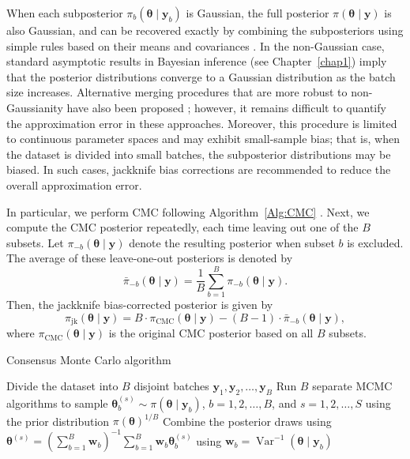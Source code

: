 When each subposterior \( \pi_b(\boldsymbol{\theta} \mid \mathbf{y}_b) \) is Gaussian, the full posterior \( \pi(\boldsymbol{\theta} \mid \mathbf{y}) \) is also Gaussian, and can be recovered exactly by combining the subposteriors using simple rules based on their means and covariances \cite{scott2016bayes, scott2022bayes}. In the non-Gaussian case, standard asymptotic results in Bayesian inference (see Chapter~\ref{chap1}) imply that the posterior distributions converge to a Gaussian distribution as the batch size increases. Alternative merging procedures that are more robust to non-Gaussianity have also been proposed \cite{neiswanger2013asymptotically, minsker2017robust}; however, it remains difficult to quantify the approximation error in these approaches. Moreover, this procedure is limited to continuous parameter spaces and may exhibit small-sample bias; that is, when the dataset is divided into small batches, the subposterior distributions may be biased. In such cases, jackknife bias corrections are recommended to reduce the overall approximation error.

In particular, we perform CMC following Algorithm~\ref{Alg:CMC} \cite{scott2016bayes}. Next, we compute the CMC posterior repeatedly, each time leaving out one of the \( B \) subsets. Let \( \pi_{-b}(\boldsymbol{\theta} \mid \mathbf{y}) \) denote the resulting posterior when subset \( b \) is excluded. The average of these leave-one-out posteriors is denoted by
\[
\bar{\pi}_{-b}(\boldsymbol{\theta} \mid \mathbf{y}) = \frac{1}{B} \sum_{b=1}^B \pi_{-b}(\boldsymbol{\theta} \mid \mathbf{y}).
\]
Then, the jackknife bias-corrected posterior is given by
\[
\pi_{\text{jk}}(\boldsymbol{\theta} \mid \mathbf{y}) = B \cdot \pi_{\text{CMC}}(\boldsymbol{\theta} \mid \mathbf{y}) - (B - 1) \cdot \bar{\pi}_{-b}(\boldsymbol{\theta} \mid \mathbf{y}),
\]
where \( \pi_{\text{CMC}}(\boldsymbol{\theta} \mid \mathbf{y}) \) is the original CMC posterior based on all \( B \) subsets.

\begin{algorithm}[h!]
	\caption{Consensus Monte Carlo algorithm}\label{Alg:CMC}
	\begin{algorithmic}[1]
		\State Divide the dataset into \( B \) disjoint batches $\mathbf{y}_1, \mathbf{y}_2, \dots, \mathbf{y}_B$
		\State Run $B$ separate MCMC algorithms to sample $\boldsymbol{\theta}_b^{(s)}\sim \pi(\boldsymbol{\theta}\mid \mathbf{y}_b)$, $b=1,2,\dots,B$, and $s=1,2,\dots,S$ using the prior distribution $\pi(\boldsymbol{\theta})^{1/B}$
		\State Combine the posterior draws using $\boldsymbol{\theta}^{(s)}=\left(\sum_{b=1}^B\mathbf{w}_b\right)^{-1} \sum_{b=1}^B\mathbf{w}_b \boldsymbol{\theta}^{(s)}_b$ using \( \mathbf{w}_b = \operatorname{Var}^{-1}(\boldsymbol{\theta} \mid \mathbf{y}_b) \)    		 			 
	\end{algorithmic} 
\end{algorithm}

